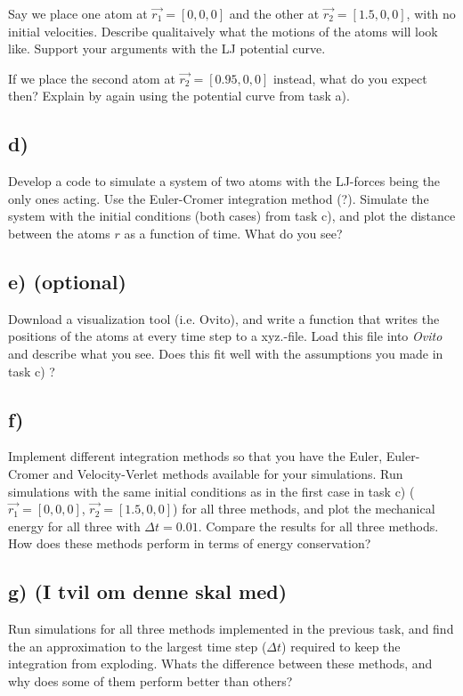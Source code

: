 \documentclass[11pt,british,a4paper]{report}
\begin{document}
Say we place one atom at $\vec{r_1} = [0, 0, 0]$ and the other at $\vec{r_2} = [1.5, 0, 0]$, with no initial velocities. Describe qualitaively what the motions of the atoms will look like. Support your arguments with the LJ potential curve.

If we place the second atom at $\vec{r_2} = [0.95, 0, 0]$ instead, what do you expect then? Explain by again using the potential curve from task a).

\subsection*{d)}

Develop a code to simulate a system of two atoms with the LJ-forces being the only ones acting. Use the Euler-Cromer integration method (?). Simulate the system with the initial conditions
(both cases) from task c), and plot the distance between the atoms $r$ as a function of time. What do you see?

\subsection*{e) (optional)}

Download a visualization tool (i.e. Ovito), and write a function that writes the positions of the atoms at every time step to a xyz.-file. Load this file into \textit{Ovito} and describe
what you see. Does this fit well with the assumptions you made in task c) ?

\subsection*{f)}

Implement different integration methods so that you have the Euler, Euler-Cromer and Velocity-Verlet methods available for your simulations. Run simulations with the same initial conditions
as in the first case in task c) ($\vec{r_1} = [0, 0, 0]$, $\vec{r_2} = [1.5, 0, 0]$) for all three methods, and plot the mechanical energy for all three with $\Delta t = 0.01$. Compare
the results for all three methods. How does these methods perform in terms of energy conservation?

\subsection*{g) (I tvil om denne skal med)}

Run simulations for all three methods implemented in the previous task, and find the an approximation to the largest time step ($\Delta t$) required to keep the integration from exploding.
Whats the difference between these methods, and why does some of them perform better than others?
\end{document}

